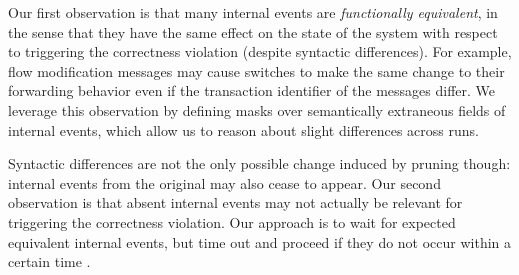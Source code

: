 Our first observation is that many internal events are {\em functionally
equivalent}, in the sense that they
have the same effect on the state of the system with respect to triggering the
correctness violation (despite syntactic differences). For example, flow
modification messages may cause switches to make the same change to their forwarding behavior
even if the transaction identifier of the messages differ. We leverage this observation by defining
masks over semantically extraneous fields of
internal events, which allow us to reason about slight differences across
runs.

Syntactic differences are not the
only possible change induced by pruning though: internal events from the original
may also cease to appear. Our second observation is that absent
internal events may not actually be relevant
for triggering the correctness violation. Our approach is to wait for expected
equivalent internal events, but time out and proceed
if they do not occur within a certain time \textepsilon.


